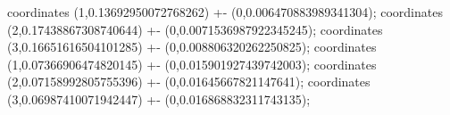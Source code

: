 coordinates {(1,0.13692950072768262) +- (0,0.006470883989341304)};
coordinates {(2,0.17438867308740644) +- (0,0.0071536987922345245)};
coordinates {(3,0.16651616504101285) +- (0,0.008806320262250825)};
coordinates {(1,0.07366906474820145) +- (0,0.015901927439742003)};
coordinates {(2,0.07158992805755396) +- (0,0.01645667821147641)};
coordinates {(3,0.06987410071942447) +- (0,0.016868832311743135)};
